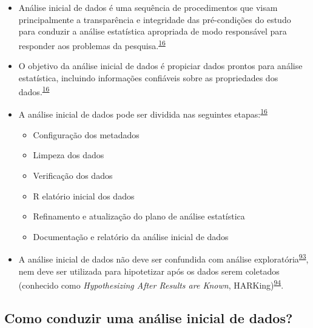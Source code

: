 \documentclass[
]{book}
\begin{document}
\begin{itemize}
\item
  Análise inicial de dados é uma sequência de procedimentos que visam principalmente a transparência e integridade das pré-condições do estudo para conduzir a análise estatística apropriada de modo responsável para responder aos problemas da pesquisa.\textsuperscript{\protect\hyperlink{ref-Baillie2022}{16}}
\item
  O objetivo da análise inicial de dados é propiciar dados prontos para análise estatística, incluindo informações confiáveis sobre as propriedades dos dados.\textsuperscript{\protect\hyperlink{ref-Baillie2022}{16}}
\item
  A análise inicial de dados pode ser dividida nas seguintes etapas:\textsuperscript{\protect\hyperlink{ref-Baillie2022}{16}}

  \begin{itemize}
  \item
    Configuração dos metadados
  \item
    Limpeza dos dados
  \item
    Verificação dos dados
  \item
    R elatório inicial dos dados
  \item
    Refinamento e atualização do plano de análise estatística
  \item
    Documentação e relatório da análise inicial de dados
  \end{itemize}
\item
  A análise inicial de dados não deve ser confundida com análise exploratória\textsuperscript{\protect\hyperlink{ref-Ferketich1986}{93}}, nem deve ser utilizada para hipotetizar após os dados serem coletados (conhecido como \emph{Hypothesizing After Results are Known}, HARKing)\textsuperscript{\protect\hyperlink{ref-Kerr1998}{94}}.
\end{itemize}

\hypertarget{como-conduzir-uma-anuxe1lise-inicial-de-dados}{%
\subsection{Como conduzir uma análise inicial de dados?}\label{como-conduzir-uma-anuxe1lise-inicial-de-dados}}
\end{document}
